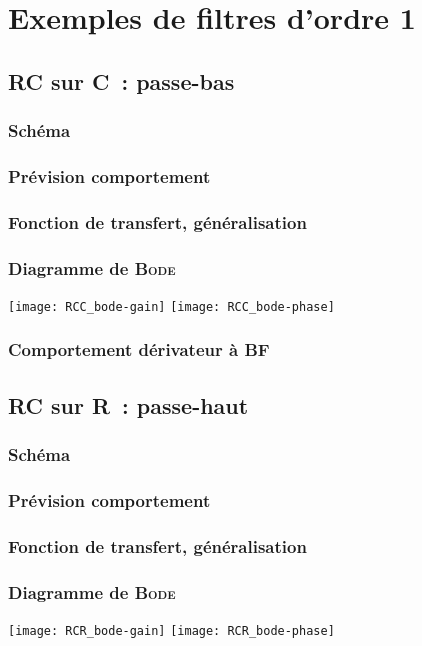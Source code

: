 \documentclass[../main/main.tex]{subfiles}
\begin{document}
\section{Exemples de filtres d'ordre 1}
\subsection{RC sur C~: passe-bas}
\subsubsection{Schéma}
\subsubsection{Prévision comportement}
\subsubsection{Fonction de transfert, généralisation}
\subsubsection{Diagramme de \textsc{Bode}}
\begin{center}
    \texttt{[image: RCC\_bode-gain]}
    \texttt{[image: RCC\_bode-phase]}
\end{center}
\subsubsection{Comportement dérivateur à BF}

\subsection{RC sur R~: passe-haut}
\subsubsection{Schéma}
\subsubsection{Prévision comportement}
\subsubsection{Fonction de transfert, généralisation}
\subsubsection{Diagramme de \textsc{Bode}}
\begin{center}
    \texttt{[image: RCR\_bode-gain]}
    \texttt{[image: RCR\_bode-phase]}
\end{center}
\end{document}
